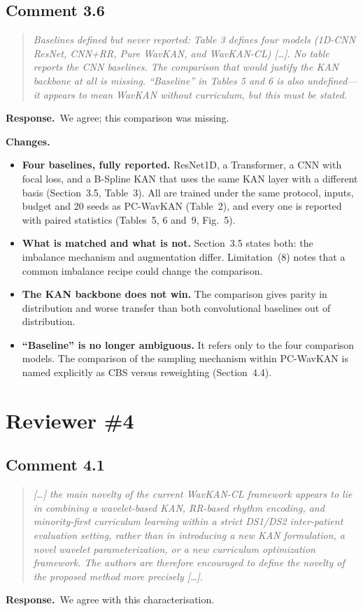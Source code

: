 \documentclass[11pt]{article}
\newenvironment{reviewer}{\begin{quote}\itshape\color{revcol}}{\end{quote}}
\newcommand{\resp}{\textbf{Response.}~}
\newcommand{\chg}{\textbf{Changes.}~}
\begin{document}
\subsection*{Comment 3.6}
\begin{reviewer}
Baselines defined but never reported: Table 3 defines four models (1D-CNN ResNet, CNN+RR, Pure WavKAN, and WavKAN-CL) [\ldots]. No table reports the CNN baselines. The comparison that would justify the KAN backbone at all is missing. ``Baseline'' in Tables 5 and 6 is also undefined---it appears to mean WavKAN without curriculum, but this must be stated.
\end{reviewer}
\resp We agree; this comparison was missing.

\chg
\begin{itemize}[leftmargin=1.2em,itemsep=2pt]
\item \textbf{Four baselines, fully reported.} ResNet1D, a Transformer, a CNN with focal loss, and a B-Spline KAN that uses the same KAN layer with a different basis (Section~3.5, Table~3). All are trained under the same protocol, inputs, budget and 20 seeds as PC-WavKAN (Table~2), and every one is reported with paired statistics (Tables~5, 6 and~9, Fig.~5).
\item \textbf{What is matched and what is not.} Section~3.5 states both: the imbalance mechanism and augmentation differ. Limitation~(8) notes that a common imbalance recipe could change the comparison.
\item \textbf{The KAN backbone does not win.} The comparison gives parity in distribution and worse transfer than both convolutional baselines out of distribution.
\item \textbf{``Baseline'' is no longer ambiguous.} It refers only to the four comparison models. The comparison of the sampling mechanism within PC-WavKAN is named explicitly as CBS versus reweighting (Section~4.4).
\end{itemize}

\section*{Reviewer \#4}

\subsection*{Comment 4.1}
\begin{reviewer}
[\ldots] the main novelty of the current WavKAN-CL framework appears to lie in combining a wavelet-based KAN, RR-based rhythm encoding, and minority-first curriculum learning within a strict DS1/DS2 inter-patient evaluation setting, rather than in introducing a new KAN formulation, a novel wavelet parameterization, or a new curriculum optimization framework. The authors are therefore encouraged to define the novelty of the proposed method more precisely [\ldots].
\end{reviewer}
\resp We agree with this characterisation.
\end{document}
